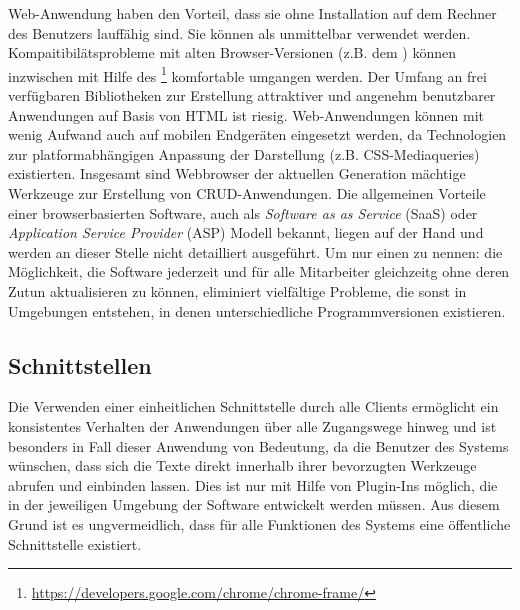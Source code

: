 Web-Anwendung haben den Vorteil, dass sie ohne Installation auf dem Rechner des Benutzers lauffähig sind. Sie können als unmittelbar verwendet werden. Kompaitibilätsprobleme mit alten Browser-Versionen (z.B. dem ) können inzwischen mit Hilfe des \footnote{\url{https://developers.google.com/chrome/chrome-frame/}} komfortable umgangen werden. Der Umfang an frei verfügbaren Bibliotheken zur Erstellung attraktiver und angenehm benutzbarer Anwendungen auf Basis von HTML ist riesig. Web-Anwendungen können mit wenig Aufwand auch auf mobilen Endgeräten eingesetzt werden, da Technologien zur platformabhängigen Anpassung der Darstellung (z.B. CSS-Mediaqueries) existierten. Insgesamt sind Webbrowser der aktuellen Generation mächtige Werkzeuge zur Erstellung von CRUD-Anwendungen. \cite{ms-key-software-development-trends} Die allgemeinen Vorteile einer browserbasierten Software, auch als \emph{Software as as Service} (SaaS) oder \emph{Application Service Provider} (ASP) Modell bekannt, liegen auf der Hand und werden an dieser Stelle nicht detailliert ausgeführt. Um nur einen zu nennen: die Möglichkeit, die Software jederzeit und für alle Mitarbeiter gleichzeitg ohne deren Zutun aktualisieren zu können, eliminiert vielfältige Probleme, die sonst in Umgebungen entstehen, in denen unterschiedliche Programmversionen existieren.

\subsection{Schnittstellen} 

Die Verwenden einer einheitlichen Schnittstelle durch alle Clients ermöglicht ein konsistentes Verhalten der Anwendungen über alle Zugangswege hinweg und ist besonders in Fall dieser Anwendung von Bedeutung, da die Benutzer des Systems wünschen, dass sich die Texte direkt innerhalb ihrer bevorzugten Werkzeuge abrufen und einbinden lassen. Dies ist nur mit Hilfe von Plugin-Ins möglich, die in der jeweiligen Umgebung der Software entwickelt werden müssen. Aus diesem Grund ist es ungvermeidlich, dass für alle Funktionen des Systems eine öffentliche Schnittstelle existiert.

